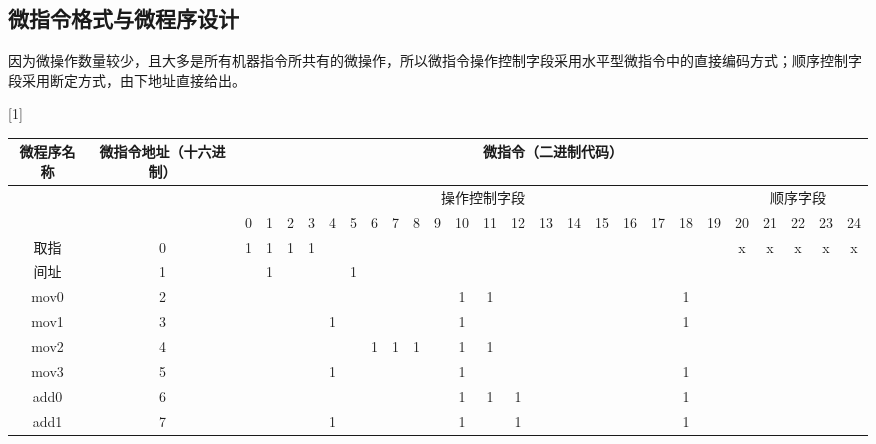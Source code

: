 \documentclass[UTF8]{ctexrep}
\begin{document}
\subsection{微指令格式与微程序设计}
因为微操作数量较少，且大多是所有机器指令所共有的微操作，所以微指令操作控制字段采用水平型微指令中的直接编码方式；顺序控制字段采用断定方式，由下地址直接给出。

\begin{landscape}
\pagestyle{empty}
\begin{center}
\scalebox{0.80}[1]{
\begin{tabular}{|c|c|c|c|c|c|c|c|c|c|c|c|c|c|c|c|c|c|c|c|c|c|c|c|c|c|c|}
\hline
微程序名称 & 微指令地址（十六进制） & \multicolumn{25}{c|}{微指令（二进制代码）}                                                                                    \\ \hline
      &             & \multicolumn{20}{c|}{操作控制字段}                                                            & \multicolumn{5}{c|}{顺序字段} \\ \hline
      &             & 0 & 1 & 2 & 3 & 4 & 5 & 6 & 7 & 8 & 9 & 10 & 11 & 12 & 13 & 14 & 15 & 16 & 17 & 18 & 19 & 20  & 21  & 22  & 23 & 24 \\ \hline
取指    & 0           & 1 & 1 & 1 & 1 &   &   &   &   &   &   &    &    &    &    &    &    &    &    &    &    & x   & x   & x   & x  & x  \\ \hline
间址    & 1           &   & 1 &   &   &   & 1 &   &   &   &   &    &    &    &    &    &    &    &    &    &    &     &     &     &    &    \\ \hline
mov0  & 2           &   &   &   &   &   &   &   &   &   &   & 1  & 1  &    &    &    &    &    &    & 1  &    &     &     &     &    &    \\ \hline
mov1  & 3           &   &   &   &   & 1 &   &   &   &   &   & 1  &    &    &    &    &    &    &    & 1  &    &     &     &     &    &    \\ \hline
mov2  & 4           &   &   &   &   &   &   & 1 & 1 & 1 &   & 1  & 1  &    &    &    &    &    &    &    &    &     &     &     &    &    \\ \hline
mov3  & 5           &   &   &   &   & 1 &   &   &   &   &   & 1  &    &    &    &    &    &    &    & 1  &    &     &     &     &    &    \\ \hline
add0  & 6           &   &   &   &   &   &   &   &   &   &   & 1  & 1  & 1  &    &    &    &    &    & 1  &    &     &     &     &    &    \\ \hline
add1  & 7           &   &   &   &   & 1 &   &   &   &   &   & 1  &    & 1  &    &    &    &    &    & 1  &    &     &     &     &    &    \\ \hline

\end{tabular}}
\end{center}
\end{landscape}
\end{document}
